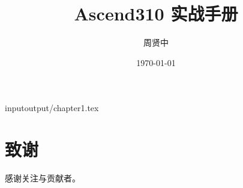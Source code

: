 \documentclass[fontsize=12pt, paper=a4, oneside, openany]{scrbook}
\title{Ascend310 实战手册}
\author{周贤中}
\date{\today}
\begin{document}
\frontmatter
\maketitle
\tableofcontents
\mainmatter

input{output/chapter1.tex}

\backmatter
\chapter*{致谢}
感谢关注与贡献者。
\end{document}
